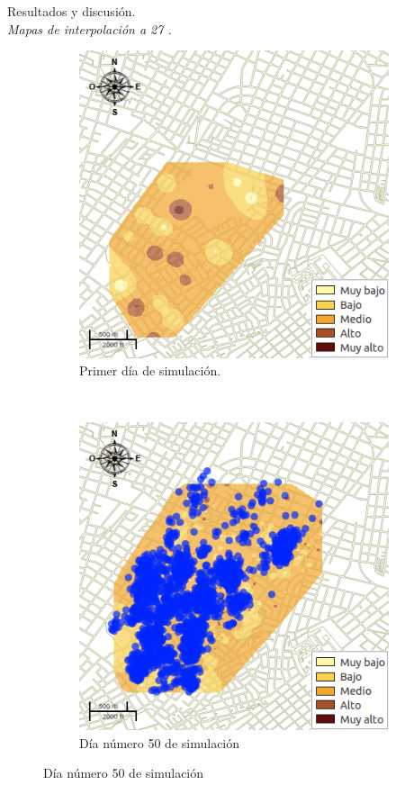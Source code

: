 \begin{frame}[t]{Resultados y discusión.\\\textit{Mapas de interpolación a 27 \textcelsius.}}
    \begin{figure}
    \begin{subfigure}[b]{0.45\textwidth}
        \includegraphics[width=\textwidth]{../book/capitulo-6/graphics/raster/temp-27-0.png}
        \caption{ Primer día de simulación.}
    \end{subfigure}
    ~~~~
    \begin{subfigure}[b]{0.45\textwidth}
        \includegraphics[width=\textwidth]{../book/capitulo-6/graphics/raster/temp-27-49.png}
        \caption{Día número 50 de simulación}
    \end{subfigure}
    \end{figure}
\end{frame}

